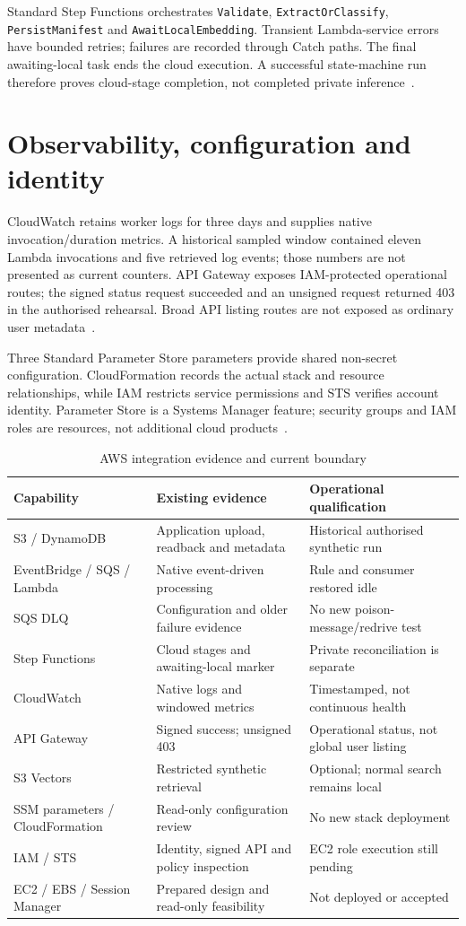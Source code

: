 \documentclass[11pt,a4paper,oneside]{report}
\begin{document}
Standard Step Functions orchestrates \texttt{Validate}, \texttt{ExtractOrClassify}, \texttt{PersistManifest} and \texttt{AwaitLocalEmbedding}. Transient Lambda-service errors have bounded retries; failures are recorded through Catch paths. The final awaiting-local task ends the cloud execution. A successful state-machine run therefore proves cloud-stage completion, not completed private inference~\cite{stepfunctions}.
\section{Observability, configuration and identity}
CloudWatch retains worker logs for three days and supplies native invocation/duration metrics. A historical sampled window contained eleven Lambda invocations and five retrieved log events; those numbers are not presented as current counters. API Gateway exposes IAM-protected operational routes; the signed status request succeeded and an unsigned request returned 403 in the authorised rehearsal. Broad API listing routes are not exposed as ordinary user metadata~\cite{cloudwatch,apigateway}.

Three Standard Parameter Store parameters provide shared non-secret configuration. CloudFormation records the actual stack and resource relationships, while IAM restricts service permissions and STS verifies account identity. Parameter Store is a Systems Manager feature; security groups and IAM roles are resources, not additional cloud products~\cite{ssm,cloudformation,iam}.
\par\begin{table}[htbp]\caption{AWS integration evidence and current boundary}\label{tab:aws}\small\begin{tabularx}{\linewidth}{p{.22\linewidth}YY}\toprule Capability&Existing evidence&Operational qualification\\\midrule
S3 / DynamoDB&Application upload, readback and metadata&Historical authorised synthetic run\\
EventBridge / SQS / Lambda&Native event-driven processing&Rule and consumer restored idle\\
SQS DLQ&Configuration and older failure evidence&No new poison-message/redrive test\\
Step Functions&Cloud stages and awaiting-local marker&Private reconciliation is separate\\
CloudWatch&Native logs and windowed metrics&Timestamped, not continuous health\\
API Gateway&Signed success; unsigned 403&Operational status, not global user listing\\
S3 Vectors&Restricted synthetic retrieval&Optional; normal search remains local\\
SSM parameters / CloudFormation&Read-only configuration review&No new stack deployment\\
IAM / STS&Identity, signed API and policy inspection&EC2 role execution still pending\\
EC2 / EBS / Session Manager&Prepared design and read-only feasibility&Not deployed or accepted\\\bottomrule\end{tabularx}\end{table}\par
\end{document}
